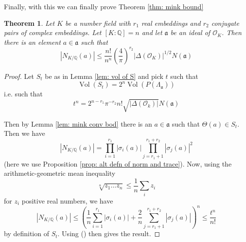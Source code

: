 \documentclass[11pt,a4paper]{report}
\theoremstyle{plain}
\newtheorem*{thm*}{Theorem}
\theoremstyle{definition}
\theoremstyle{definition}
\def\QQ{\mathbb{Q}}
\def \s {\sigma}
\def \OO {\mathcal{O}}
\def \s {\sigma}
\def\gotha{\mathfrak{a}}
\DeclareMathOperator{\Vol}{Vol}
\begin{document}
	Finally, with this we can finally prove Theorem \ref{thm: mink bound}
	
	\begin{thm*}
		Let $K$ be a number field with $r_1$ real embeddings and $r_2$ conjugate pairs of complex embeddings. Let $[K:\QQ]=n$ and let $\gotha$ be an ideal of $\OO_K$. Then there is an element $a \in \gotha$ such that \[|N_{K/\QQ}(a)| \leq  \frac{n!}{n^n} \left( \frac{4}{\pi} \right)^{r_2} |\Delta(\OO_K)|^{1/2} N(\gotha) \]
	\end{thm*} 
	
	\begin{proof}
		Let $S_t$ be as in Lemma \ref{lem: vol of S} and pick $t$ such that \[\Vol(S_t)=2^n \Vol(P(\Lambda_\gotha))\] i.e. such that \[t^n=2^{n-r_1}\pi^{-r_2}n! \sqrt{|\Delta(\OO_k)|} N(\gotha) \tag{\faPaw}\]	
		
		Then by Lemma \ref{lem: mink conv bod} there is an $a \in \gotha$ such that $\Theta(a) \in S_t$. Then we have \[|N_{K/\QQ}(a)|= \prod_{i=1}^{r_1} |\s_i(a)| \prod_{j=r_1+1}^{r_1+r_2} |\s_j(a)|^2 \] (here we use Proposition \ref{prop: alt defn of norm and trace}). Now, using the arithmetic-geometric mean inequality \[\sqrt[n]{z_1\dots z_n} \leq \frac{1}{n} \sum_i z_i\] for $z_i$ positive real numbers, we have \[|N_{K/\QQ}(a)| \leq \left( \frac{1}{n}\sum_{i=1}^{r_1} |\s_i(a)|+ \frac{2}{n}\sum_{j=r_1+1}^{r_1+r_2} |\s_j(a)| \right)^n \leq \frac{t^n}{n!}\] by definition of $S_t$. 	Using (\faPaw) then gives the result.
		
	\end{proof}
	
	
	
	
	
	
	
	
	
	
	
	
	
	
\end{document}
